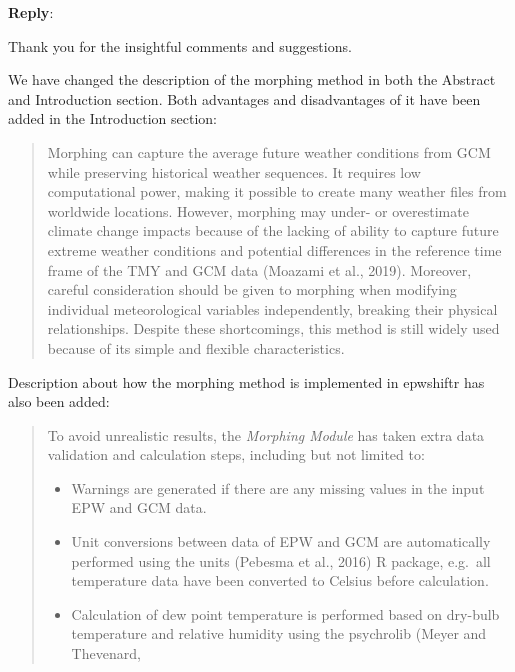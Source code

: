 \documentclass[11pt]{article}
\newcounter{reviewer}
\newcounter{point}[reviewer]
\newenvironment{reply}
   {\medskip \noindent \textbf{Reply}:\  }
   {\medskip }
\providecommand{\tightlist}{\setlength{\itemsep}{0pt}\setlength{\parskip}{0pt}}
\begin{document}
\begin{reply}

\label{rp:validation}
Thank you for the insightful comments and suggestions.

We have changed the description of the morphing method in both the Abstract and
Introduction section. Both advantages and disadvantages of it have been added in
the Introduction section:

\begin{quote}
Morphing can capture the average future weather conditions from GCM while
preserving historical weather sequences. It requires low computational power,
making it possible to create many weather files from worldwide locations.
However, morphing may under- or overestimate climate change impacts because of
the lacking of ability to capture future extreme weather conditions and
potential differences in the reference time frame of the TMY and GCM data
(Moazami et al., 2019). Moreover, careful consideration should be given to
morphing when modifying individual meteorological variables independently,
breaking their physical relationships. Despite these shortcomings, this method
is still widely used because of its simple and flexible characteristics.
\end{quote}

Description about how the morphing method is implemented in epwshiftr has also
been added:

\begin{quote}
To avoid unrealistic results, the \emph{Morphing Module} has taken extra data
validation and calculation steps, including but not limited to:

\begin{itemize}
\tightlist
\item
  Warnings are generated if there are any missing values in the input EPW and
  GCM data.
\item
  Unit conversions between data of EPW and GCM are automatically performed using
  the units (Pebesma et al., 2016) R package, e.g.~all temperature data have
  been converted to Celsius before calculation.
\item
  Calculation of dew point temperature is performed based on dry-bulb
  temperature and relative humidity using the psychrolib (Meyer and Thevenard,


\end{itemize}
\end{quote}
\end{reply}
\end{document}
